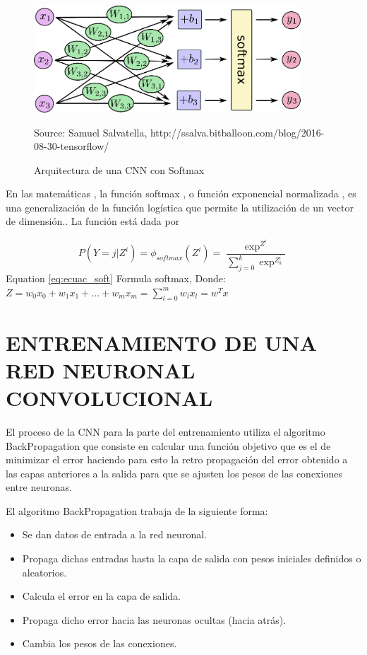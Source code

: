\begin{figure}[H]
		\centering
		\includegraphics[width=100mm]{./Imagenes/arquitectura_cnn_softmax.png}
		\caption{Arquitectura de una CNN con Softmax}
		Source: Samuel Salvatella, http://ssalva.bitballoon.com/blog/2016-08-30-tensorflow/
		\label{fig:arquitectura_cnn_softmax}
\end{figure}


En las matemáticas , la función softmax , o función exponencial normalizada , es
una generalización de la función logística que permite la utilización de un vector de
dimensión.. La función está dada por

\begin{equation}\label{eq:ecuac_soft}
P(Y = j|Z^i) = \phi_{softmax}(Z^i)= \frac{\exp^{Z^i}}{\sum^k_{j=0}\exp^{Z^{i}_k}}
\end{equation}
Equation \eqref{eq:ecuac_soft} Formula softmax, Donde:\\
$Z = w_{0}x_{0} + w_{1}x_{1} +...+w_{m}x_{m} = \sum_{l=0}^m w_{l}x_{l} = w^Tx$


\section{ENTRENAMIENTO DE UNA RED NEURONAL CONVOLUCIONAL}

El proceso de la CNN para la parte del entrenamiento utiliza el algoritmo
BackPropagation que consiste en calcular una función objetivo que es el de minimizar el
error haciendo para esto la retro propagación del error obtenido a las capas anteriores a la
salida para que se ajusten los pesos de las conexiones entre neuronas.

El algoritmo BackPropagation trabaja de la siguiente forma:

\begin{itemize}
\item Se dan datos de entrada a la red neuronal.
\item Propaga dichas entradas hasta la capa de salida con pesos iniciales definidos o
aleatorios.
\item Calcula el error en la capa de salida.
\item Propaga dicho error hacia las neuronas ocultas (hacia atrás).
\item Cambia los pesos de las conexiones.
\end{itemize}


